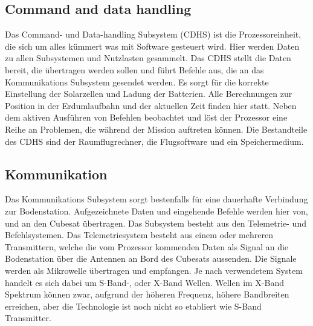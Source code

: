 		\subsection{Command and data handling}%
		Das Command- und Data-handling Subsystem (CDHS) ist die Prozessoreinheit, die sich um alles kümmert was mit Software gesteuert wird. Hier werden Daten zu allen Subsystemen und Nutzlasten gesammelt. Das CDHS stellt die Daten bereit, die übertragen werden sollen und führt Befehle aus, die an das Kommunikations Subsystem gesendet werden. 
Es sorgt für die korrekte Einstellung der Solarzellen und Ladung der Batterien. Alle Berechnungen zur Position in der Erdumlaufbahn und der aktuellen Zeit finden hier statt.
Neben dem aktiven Ausführen von Befehlen beobachtet und löst der Prozessor eine Reihe an Problemen, die während der Mission auftreten können.
Die Bestandteile des CDHS sind der Raumflugrechner, die Flugsoftware und ein Speichermedium.

		\subsection{Kommunikation}%
		Das Kommunikations Subsystem sorgt bestenfalls für eine dauerhafte Verbindung zur Bodenstation. Aufgezeichnete Daten und eingehende Befehle werden hier von, und an den Cubesat übertragen. Das Subsystem besteht aus den Telemetrie- und Befehlsystemen.
Das Telemetriesystem besteht aus einem oder mehreren Transmittern, welche die vom Prozessor kommenden Daten als Signal an die Bodenstation über die Antennen an Bord des Cubesats aussenden. Die Signale werden als Mikrowelle übertragen und empfangen. Je nach verwendetem System handelt es sich dabei um S-Band-, oder X-Band Wellen. Wellen im X-Band Spektrum können zwar, aufgrund der höheren Frequenz, höhere Bandbreiten erreichen, aber die Technologie ist noch nicht so etabliert wie S-Band Transmitter.
		
